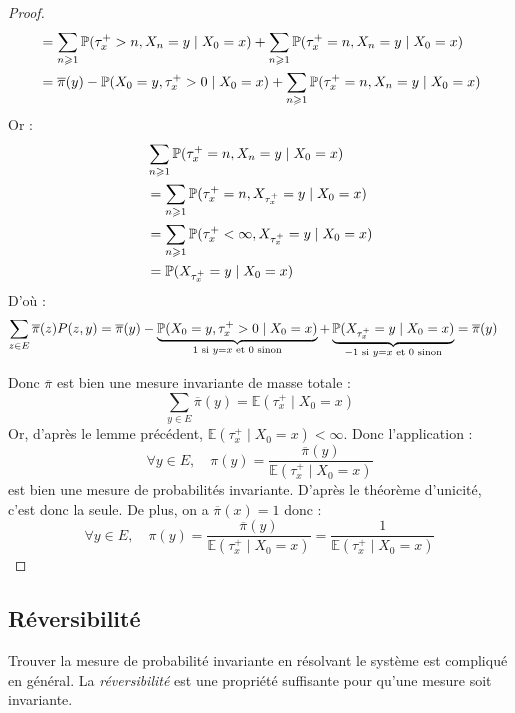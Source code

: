 \begin{proof}
\begin{align*}
            &= \sum_{n \geqslant 1} \mathbb{P}(\tau_x^+ > n, X_{n} = y \; | \; X_0 = x) + \sum_{n \geqslant 1} \mathbb{P}(\tau_x^+ = n, X_{n} = y \; | \; X_0 = x) \\ 
            &= \overline{ \pi}(y) - \mathbb{P}(X_0 = y, \tau_x^+ > 0 \; | \; X_0 = x) + \sum_{n \geqslant 1} \mathbb{P}(\tau_x^+ = n, X_{n} = y \; | \; X_0 = x)
        \end{align*}
    Or : 
        \begin{align*}
            & \sum_{n \geqslant 1} \mathbb{P}(\tau_x^+ = n, X_{n} = y \; | \; X_0 = x) \\ 
            &= \sum_{n \geqslant 1} \mathbb{P}(\tau_x^+ = n, X_{ \tau_x^+} = y \; | \; X_0 = x) \\ 
            &= \sum_{n \geqslant 1} \mathbb{P}( \tau_x^+ < \infty, X_{ \tau_x^+} = y \; | \; X_0 = x) \\ 
            &= \mathbb{P}(X_{ \tau_x^+} = y\; | \; X_0 = x)
        \end{align*}
    D'où : 
        \begin{align*}
            \sum_{z \in E} \overline{ \pi}(z) P(z,y) &= \overline{ \pi}(y) - \underbrace{\mathbb{P}(X_0 = y, \tau_x^+ > 0 \mid X_0 = x)}_{1 \text{ si } y = x \text{ et } 0 \text{ sinon}} + \underbrace{ \mathbb{P}(X_{ \tau_x^+} = y \mid X_0 = x)}_{-1 \text{ si } y = x \text{ et } 0 \text{ sinon}}
            = \overline{ \pi}(y)  
        \end{align*}
    
    Donc $ \overline{ \pi}$ est bien une mesure invariante de masse totale : 
        \[ \sum_{y \in E} \overline{ \pi}(y) = \mathbb{E}( \tau_x^+ \; | \; X_0 = x) \] 
    Or, d'après le lemme précédent, $  \mathbb{E}( \tau_x^+ \; | \; X_0 = x) < \infty$. 
    Donc l'application : 
        \[ \forall y \in E, \quad \pi(y) = \frac{ \overline{ \pi}(y)}{ \mathbb{E}(\tau_x^+ \; | \; X_0 = x)}\] 
    est bien une mesure de probabilités invariante. D'après le théorème d'unicité, c'est donc la seule. De plus, on a 
    $ \overline{ \pi}(x) = 1$ donc : 
        \[ \forall y \in E, \quad \pi(y) = \frac{ \overline{ \pi}(y)}{ \mathbb{E}( \tau_x^+ \; | \; X_0 = x)} = \frac{ 1}{ \mathbb{E}( \tau_x^+ \; | \; X_0 = x)} \] 
\end{proof}

\subsection{Réversibilité}

Trouver la mesure de probabilité invariante en résolvant le système est compliqué en général. La \emph{réversibilité}
est une propriété suffisante pour qu'une mesure soit invariante. 

